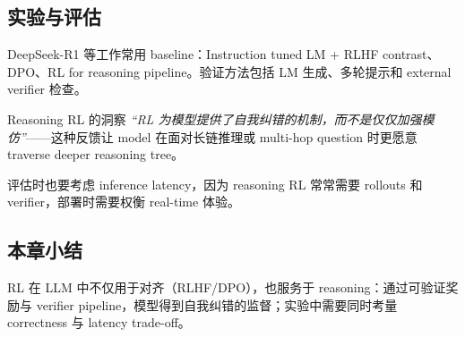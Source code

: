 \subsection{实验与评估}

DeepSeek-R1 等工作常用 baseline：Instruction tuned LM + RLHF contrast、DPO、RL for reasoning pipeline。验证方法包括 LM 生成、多轮提示和 external verifier 检查。

\begin{importantbox}{Reasoning RL 的洞察}
\textit{``RL 为模型提供了自我纠错的机制，而不是仅仅加强模仿''}——这种反馈让 model 在面对长链推理或 multi-hop question 时更愿意 traverse deeper reasoning tree。
\end{importantbox}

评估时也要考虑 inference latency，因为 reasoning RL 常常需要 rollouts 和 verifier，部署时需要权衡 real-time 体验。

\subsection{本章小结}

RL 在 LLM 中不仅用于对齐（RLHF/DPO），也服务于 reasoning：通过可验证奖励与 verifier pipeline，模型得到自我纠错的监督；实验中需要同时考量 correctness 与 latency trade-off。

